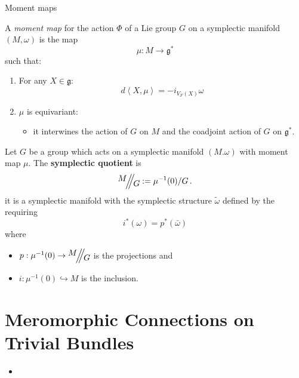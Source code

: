\begin{frame}[t]{Moment maps}
  \begin{defn}
    A \emph{moment map} for the action $\Phi$ of a Lie group $G$ on a
    symplectic manifold $(M,\omega)$ is the map
    \[
      \mu:M\to\mathfrak{g}^*
    \]
    such that:
    \begin{enumerate}
      \item For any $X\in\mathfrak{g}$:
        \[
          d\left\langle X,\mu \right\rangle=-i_{V_F(X)}\omega
        \]
      \item $\mu$ is equivariant:
        \begin{itemize}
          \item it interwines the action of $G$ on $M$ and the coadjoint
            action of $G$ on $\mathfrak{g}^*$.
        \end{itemize}
    \end{enumerate}
  \end{defn}
  Let $G$ be a group which acts on a symplectic manifold $(M.\omega)$ with
  moment map $\mu$.
  The \textbf{symplectic quotient} is
  \[
    \symplquot{M}{G}:=\mu^{-1}(0)/G \,.
  \]
  it is a symplectic manifold with the symplectic structure $\tilde\omega$
  defined by the requiring
  \[
    i^*(\omega)=p^*(\bar\omega)
  \]
  where
  \begin{itemize}
    \item $p:\mu^{-1}(0)\to\symplquot{M}{G}$ is the projections and
    \item $i:\mu^{-1}(0)\hookrightarrow M$ is the inclusion.
  \end{itemize}
\end{frame}

\section{Meromorphic Connections on Trivial Bundles}%
\begin{frame}[t]
  {\Huge\insertsection{}}
  \begin{itemize}
    \item \cite{boalch}
  \end{itemize}
\end{frame}

